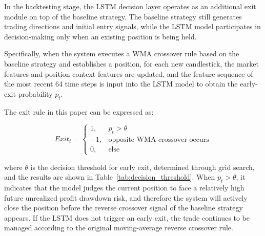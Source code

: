 \documentclass[12pt]{article}
\begin{document}
In the backtesting stage, the LSTM decision layer operates as an additional exit module on top 
of the baseline strategy. The baseline strategy still generates trading directions and initial 
entry signals, while the LSTM model participates in decision-making only when an existing 
position is being held.

Specifically, when the system executes a WMA crossover rule based on the baseline strategy and 
establishes a position, for each new candlestick, the market features and position-context 
features are updated, and the feature sequence of the most recent 64 time steps is input into 
the LSTM model to obtain the early-exit probability $p_t$.

The exit rule in this paper can be expressed as:

\begin{equation}
    Exit_t =
    \begin{cases}
    1, & p_t > \theta \\
    -1, & \text{opposite WMA crossover occurs} \\
    0, & \text{else}
    \end{cases}
\end{equation}

where $\theta$ is the decision threshold for early exit, determined through grid search, and 
the results are shown in Table~\ref{tab:decision_threshold}. When $p_t > \theta$, it indicates 
that the model judges the current position to face a relatively high future unrealized profit 
drawdown risk, and therefore the system will actively close the position before the reverse 
crossover signal of the baseline strategy appears. If the LSTM does not trigger an early exit, 
the trade continues to be managed according to the original moving-average reverse crossover 
rule.
\end{document}
